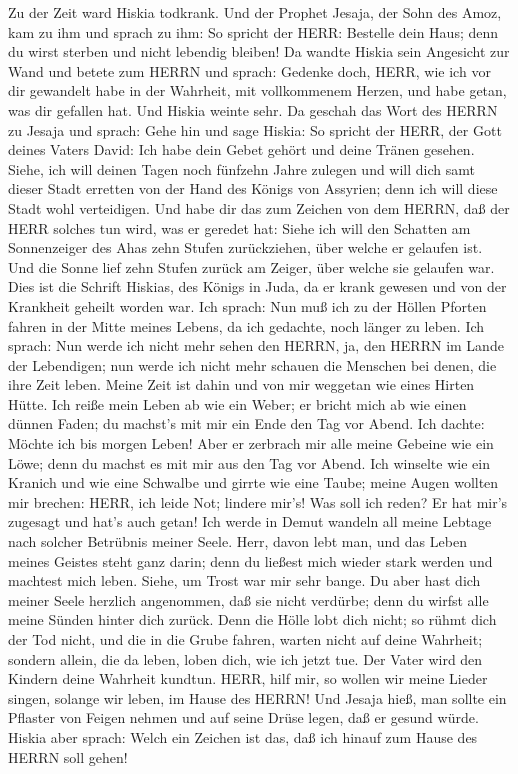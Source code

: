  Zu der Zeit ward Hiskia todkrank. Und der Prophet Jesaja,
der Sohn des Amoz, kam zu ihm und sprach zu ihm: So spricht der HERR:
Bestelle dein Haus; denn du wirst sterben und nicht lebendig bleiben!
 Da wandte Hiskia sein Angesicht zur Wand und betete zum
HERRN  und sprach: Gedenke doch, HERR, wie ich vor dir
gewandelt habe in der Wahrheit, mit vollkommenem Herzen, und habe getan,
was dir gefallen hat. Und Hiskia weinte sehr.  Da geschah
das Wort des HERRN zu Jesaja und sprach:  Gehe hin und sage
Hiskia: So spricht der HERR, der Gott deines Vaters David: Ich habe dein
Gebet gehört und deine Tränen gesehen. Siehe, ich will deinen Tagen noch
fünfzehn Jahre zulegen  und will dich samt dieser Stadt
erretten von der Hand des Königs von Assyrien; denn ich will diese Stadt
wohl verteidigen.  Und habe dir das zum Zeichen von dem
HERRN, daß der HERR solches tun wird, was er geredet hat: 
Siehe ich will den Schatten am Sonnenzeiger des Ahas zehn Stufen
zurückziehen, über welche er gelaufen ist. Und die Sonne lief zehn
Stufen zurück am Zeiger, über welche sie gelaufen war.  Dies
ist die Schrift Hiskias, des Königs in Juda, da er krank gewesen und von
der Krankheit geheilt worden war.  Ich sprach: Nun muß ich
zu der Höllen Pforten fahren in der Mitte meines Lebens, da ich
gedachte, noch länger zu leben.  Ich sprach: Nun werde ich
nicht mehr sehen den HERRN, ja, den HERRN im Lande der Lebendigen; nun
werde ich nicht mehr schauen die Menschen bei denen, die ihre Zeit
leben.  Meine Zeit ist dahin und von mir weggetan wie eines
Hirten Hütte. Ich reiße mein Leben ab wie ein Weber; er bricht mich ab
wie einen dünnen Faden; du machst's mit mir ein Ende den Tag vor Abend.
 Ich dachte: Möchte ich bis morgen Leben! Aber er zerbrach
mir alle meine Gebeine wie ein Löwe; denn du machst es mit mir aus den
Tag vor Abend.  Ich winselte wie ein Kranich und wie eine
Schwalbe und girrte wie eine Taube; meine Augen wollten mir brechen:
HERR, ich leide Not; lindere mir's!  Was soll ich reden? Er
hat mir's zugesagt und hat's auch getan! Ich werde in Demut wandeln all
meine Lebtage nach solcher Betrübnis meiner Seele.  Herr,
davon lebt man, und das Leben meines Geistes steht ganz darin; denn du
ließest mich wieder stark werden und machtest mich leben. 
Siehe, um Trost war mir sehr bange. Du aber hast dich meiner Seele
herzlich angenommen, daß sie nicht verdürbe; denn du wirfst alle meine
Sünden hinter dich zurück.  Denn die Hölle lobt dich nicht;
so rühmt dich der Tod nicht, und die in die Grube fahren, warten nicht
auf deine Wahrheit;  sondern allein, die da leben, loben
dich, wie ich jetzt tue. Der Vater wird den Kindern deine Wahrheit
kundtun.  HERR, hilf mir, so wollen wir meine Lieder
singen, solange wir leben, im Hause des HERRN!  Und Jesaja
hieß, man sollte ein Pflaster von Feigen nehmen und auf seine Drüse
legen, daß er gesund würde.  Hiskia aber sprach: Welch ein
Zeichen ist das, daß ich hinauf zum Hause des HERRN soll gehen!

